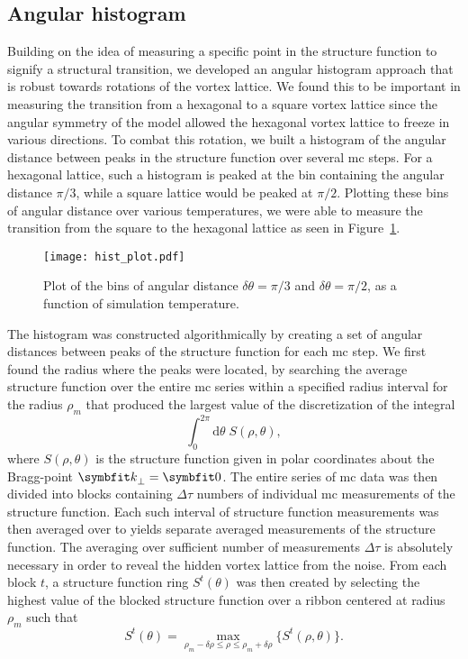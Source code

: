 \subsection{Angular histogram}

Building on the idea of measuring a specific point in the structure function to signify a structural transition, we developed an angular histogram approach that is robust towards rotations of the
vortex lattice. We found this to be important in measuring the transition from a hexagonal to a square vortex lattice since the angular symmetry of the model allowed the hexagonal vortex lattice to
freeze in various directions. To combat this rotation, we built a histogram of the angular distance between peaks in the structure function over several \ac{mc} steps. For a hexagonal
lattice, such a histogram is peaked at the bin containing  the angular distance $\pi/3$, while a square lattice would be peaked at $\pi/2$. Plotting these bins of angular distance over various
temperatures, we were able to measure the transition from the square to the hexagonal lattice as seen in Figure~\ref{fig:Vor:Symm:AH:histPrTemp}.

\begin{figure}[h]
    \centering
    \texttt{[image: hist\_plot.pdf]}
    \caption{Plot of the bins of angular distance $\delta\theta = \pi/3$ and $\delta\theta = \pi/2$, as a function of simulation temperature.}
    \label{fig:Vor:Symm:AH:histPrTemp}
\end{figure}

The histogram was constructed algorithmically by creating a set of angular distances between peaks of the structure function for each \ac{mc} step. We first found the radius where the peaks were
located, by searching the average structure function over the entire \ac{mc} series within a specified radius interval for the radius $\rho_m$ that produced the largest value of the
discretization of the integral
\begin{equation}
    \label{eq:Vor:Symm:AH:searchIntegral}
    \int_0^{2\pi}\!\!\!\!\!\!\mathrm{d}\theta\; S(\rho,\theta),
\end{equation}
where $S(\rho,\theta)$ is the structure function given in polar coordinates about the Bragg-point $\v{k}_\perp = \v{0}$. The entire series of \ac{mc} data was then divided into blocks
containing $\Delta\tau$ numbers of individual \ac{mc} measurements of the structure function. Each such interval of structure function measurements was then averaged over to yields separate
averaged measurements of the structure function. The averaging over sufficient number of measurements $\Delta\tau$ is absolutely necessary in order to reveal the hidden vortex lattice from the noise.
From each block $t$,
a structure function ring $S^t(\theta)$ was then created by selecting the highest value of the blocked structure function over a ribbon centered at radius $\rho_m$ such that
\begin{equation}
    \label{eq:Vor:Symm:AH:ribbonMaximum}
    S^t(\theta) = \max_{\rho_m-\delta\rho\leq\rho\leq\rho_m+\delta\rho}\{S^t(\rho,\theta)\}.
\end{equation}

